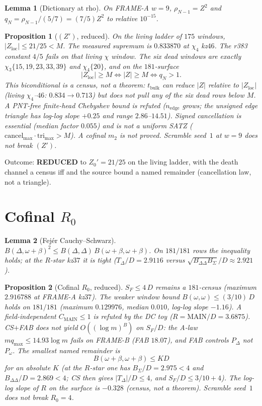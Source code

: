 \documentclass[11pt]{article}
\newtheorem{lemma}{Lemma}
\newtheorem{prop}{Proposition}
\theoremstyle{remark}
\newcommand{\loc}{\mathrm{loc}}
\begin{document}
\begin{lemma}[Dictionary at rho]\label{lem:dict}
On FRAME-A $w=9$, $\rho_{N-1}=Z^2$ and
$q_N=\rho_{N-1}/(5/7)=(7/5)Z^2$ to relative $10^{-15}$.
\end{lemma}

\begin{prop}[$(Z')$, reduced]\label{prop:Zp}
On the living ladder of $175$ windows,
$\lvert Z_{\loc}\rvert\le 21/25<M$.  The measured supremum is
$0.833870$ at $\chi_4$ kz$46$.  The r383 constant $4/5$
fails on that living $\chi$ window.  The six dead windows
are exactly $\chi_3\{15,19,23,33,39\}$ and $\chi_4\{20\}$,
and on the $181$-surface
\[
  \lvert Z_{\loc}\rvert\ge M
  \iff
  \lvert Z\rvert\ge M
  \iff
  q_N>1.
\]
This biconditional is a census, not a theorem: $t_{\mathrm{bulk}}$
can reduce $\lvert Z\rvert$ relative to $\lvert Z_{\loc}\rvert$
(living $\chi_4$--$46$: $0.834\to 0.713$) but does not pull any
of the six dead rows below $M$.
A PNT-free finite-head Chebyshev bound is refuted
($n_{\mathrm{edge}}$ grows; the unsigned edge triangle has
log-log slope $+0.25$ and range $2.86$--$14.51$).
Signed cancellation is essential (median factor $0.055$) and
is not a uniform SATZ
($\mathrm{cancel}_{\max}\cdot\mathrm{tri}_{\max}>M$).
A cofinal $m_2$ is not proved.  Scramble seed~$1$ at $w=9$
does not break $(Z')$.
\end{prop}

\noindent
Outcome: \textbf{REDUCED} to $Z_0'=21/25$ on the living
ladder, with the death channel a census iff and the source
bound a named remainder (cancellation law, not a triangle).

\section{Cofinal $R_0$}\label{sec:R}

\begin{lemma}[Fej\'er Cauchy--Schwarz]\label{lem:cs}
$B(\Delta,\omega+\beta)^2\le B(\Delta,\Delta)\,B(\omega+\beta,\omega+\beta)$.
On $181/181$ rows the inequality holds; at the $R$-star
kz$37$ it is tight
($T_{\Delta}/D=2.9116$ versus $\sqrt{B_{\Delta\Delta}B_{\Sigma}}/D\approx 2.921$).
\end{lemma}

\begin{prop}[Cofinal $R_0$, reduced]\label{prop:R}
$S_F\le 4\,D$ remains a $181$-census (maximum $2.916788$ at
FRAME-A kz$37$).  The weaker window bound
$B(\omega,\omega)\le(3/10)\,D$ holds on $181/181$ (maximum
$0.129976$, median $0.010$, log-log slope $-1.16$).
A field-independent $C_{\mathrm{MAIN}}\le 1$ is refuted by the
DC toy ($R=\mathrm{MAIN}/D=3.6875$).
CS$+$FAB does not yield $O((\log m)^B)$ on $S_F/D$: the A-law
$m q_{\max}\le 14.93\log m$ fails on FRAME-B (FAB $18.07$),
and FAB controls $P_\Delta$ not $P_\omega$.
The smallest named remainder is
\[
  B(\omega+\beta,\omega+\beta)\le K D
\]
for an absolute $K$ (at the $R$-star one has $B_\Sigma/D=2.975<4$
and $B_{\Delta\Delta}/D=2.869<4$; CS then gives
$\lvert T_\Delta\rvert/D\le 4$, and $S_F/D\le 3/10+4$).
The log-log slope of $R$ on the surface is $-0.328$ (census,
not a theorem).  Scramble seed~$1$ does not break $R_0=4$.
\end{prop}
\end{document}

